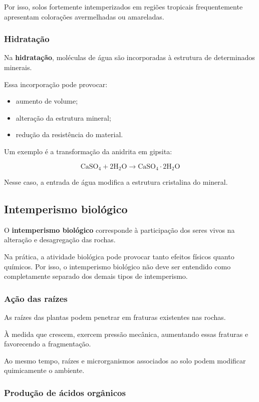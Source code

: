 Por isso, solos fortemente intemperizados em regiões tropicais frequentemente apresentam colorações avermelhadas ou amareladas.

\subsubsection{Hidratação}

Na \textbf{hidratação}, moléculas de água são incorporadas à estrutura de determinados minerais.

Essa incorporação pode provocar:

\begin{itemize}
    \item aumento de volume;
    \item alteração da estrutura mineral;
    \item redução da resistência do material.
\end{itemize}

Um exemplo é a transformação da anidrita em gipsita:

\[
\mathrm{CaSO_4 + 2H_2O
\rightarrow
CaSO_4\cdot 2H_2O}
\]

Nesse caso, a entrada de água modifica a estrutura cristalina do mineral.

\subsection{Intemperismo biológico}

O \textbf{intemperismo biológico} corresponde à participação dos seres vivos na alteração e desagregação das rochas.

Na prática, a atividade biológica pode provocar tanto efeitos físicos quanto químicos. Por isso, o intemperismo biológico não deve ser entendido como completamente separado dos demais tipos de intemperismo.

\subsubsection{Ação das raízes}

As raízes das plantas podem penetrar em fraturas existentes nas rochas.

À medida que crescem, exercem pressão mecânica, aumentando essas fraturas e favorecendo a fragmentação.

Ao mesmo tempo, raízes e microrganismos associados ao solo podem modificar quimicamente o ambiente.

\subsubsection{Produção de ácidos orgânicos}

